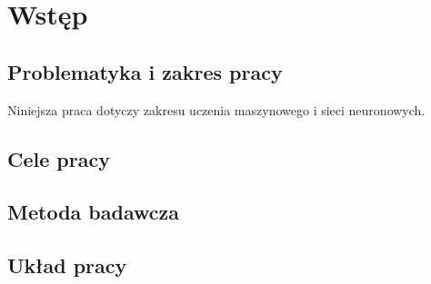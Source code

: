 \chapter{Wstęp} \label{rozdz.wstep} 
\section{Problematyka i zakres pracy}
Niniejsza praca dotyczy zakresu uczenia maszynowego i sieci neuronowych.
\section{Cele pracy}
\section{Metoda badawcza}
\section{Układ pracy}
